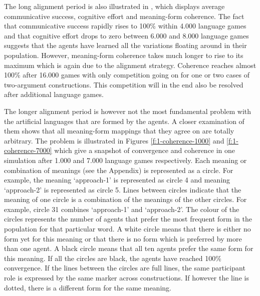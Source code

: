 The long alignment period is also illustrated in , which displays average communicative success, cognitive effort and meaning-form coherence. The fact that communicative success rapidly rises to 100\% within 4.000 language games and that cognitive effort drops to zero between 6.000 and 8.000 language games suggests that the agents have learned all the variations floating around in their population. However, meaning-form coherence takes much longer to rise to its maximum which is again due to the alignment strategy. Coherence reaches almost 100\% after 16.000 games with only competition going on for one or two cases of two-argument constructions. This competition will in the end also be resolved after additional language games.

The longer alignment period is however not the most fundamental problem with the artificial languages that are formed by the agents. A closer examination of them shows that all meaning-form mappings that they agree on are totally arbitrary. The problem is illustrated in Figures \ref{f:1-coherence-1000} and \ref{f:1-coherence-7000} which give a snapshot of convergence and coherence in one simulation after 1.000 and 7.000 language games respectively. Each meaning or combination of meanings (see the Appendix) is represented as a circle. For example, the meaning `approach-1' is represented as circle 4 and meaning `approach-2' is represented as circle 5. Lines between circles indicate that the meaning of one circle is a combination of the meanings of the other circles. For example, circle 31 combines `approach-1' and `approach-2'. The colour of the circles represents the number of agents that prefer the most frequent form in the population for that particular word. A white circle means that there is either no form yet for this meaning or that there is no form which is preferred by more than one agent. A black circle means that all ten agents prefer the same form for this meaning. If all the circles are black, the agents have reached 100\% convergence. If the lines between the circles are full lines, the same participant role is expressed by the same marker across constructions. If however the line is dotted, there is a different form for the same meaning.


